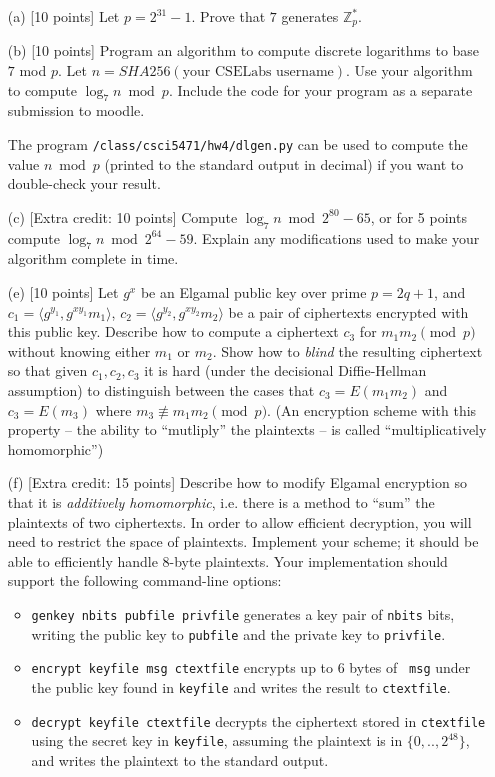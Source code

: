 \documentclass[11pt]{article}
\begin{document}
\begin{itemize}
\item[(a)] [10 points] Let $p = 2^{31}-1$.  Prove that $7$ generates $\mathbb{Z}_p^*$.
\item[(b)] [10 points] Program an algorithm to compute discrete
  logarithms to base $7$ mod $p$.  Let $n = SHA256(\textrm{your CSELabs
    username})$. Use your algorithm to compute $\log_7 n \bmod p$.
  Include the code for your program as a separate submission to moodle. 

  The program \verb#/class/csci5471/hw4/dlgen.py# can be used to
  compute the value $n \bmod p$ (printed to the standard output in decimal) if
  you want to double-check your result.

\item[(c)] [Extra credit: 10 points] Compute $\log_7 n \bmod
  2^{80}-65$, or for 5 points compute $\log_7 n \bmod 2^{64}-59$.
  Explain any modifications used to make your algorithm complete in time.

\item[(e)] [10 points] Let $g^x$ be an Elgamal public key over prime $p=2q+1$,  and $c_1 =
  \langle g^{y_1}, g^{xy_1}m_1 \rangle$, $c_2 = \langle g^{y_2},
  g^{xy_2} m_2\rangle$ be a pair of ciphertexts encrypted with this
  public key.  Describe how to compute a ciphertext $c_3$ for $m_1m_2 \pmod p$
  without knowing either $m_1$ or $m_2$.  Show how to {\em blind} the
  resulting ciphertext so that given $c_1,c_2,c_3$ it is hard (under
  the decisional Diffie-Hellman assumption) to distinguish between the
  cases that $c_3 = E(m_1m_2)$ and $c_3 = E(m_3)$ where $m_3
  \not\equiv m_1m_2 \pmod p$.  (An encryption scheme with this
  property -- the ability to ``mutliply'' the plaintexts -- is called
  ``multiplicatively homomorphic'')

\item[(f)] [Extra credit: 15 points] Describe how to modify Elgamal
  encryption so that it is {\em additively homomorphic}, i.e. there is
  a method to ``sum'' the plaintexts of two ciphertexts.   In order to
  allow efficient decryption, you will need to restrict the space of
  plaintexts.  Implement your scheme; it should be able to efficiently
  handle 8-byte plaintexts.    Your implementation should support the
  following command-line options:
  \begin{itemize}
    \item \verb#genkey nbits pubfile privfile# generates a key pair of
      {\tt nbits} bits, writing the public key to {\tt pubfile} and
      the private key to {\tt privfile}.
    \item \verb#encrypt keyfile msg ctextfile#  encrypts up to 6 bytes of {\tt
        msg} under the public key found in {\tt keyfile} and writes
      the result to {\tt ctextfile}.
    \item \verb#decrypt keyfile ctextfile# decrypts the ciphertext
      stored in {\tt ctextfile} using the secret key in {\tt keyfile},
      assuming the plaintext is in $\{0,..,2^{48}\}$, and writes the
      plaintext to the standard output.


\end{itemize}
\end{itemize}
\end{document}

